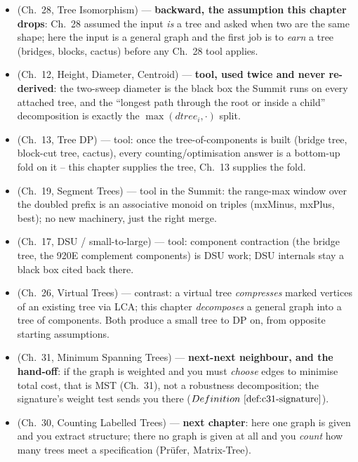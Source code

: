 
\begin{itemize}[nosep, leftmargin=1.4em]
  \item {} (Ch.~28, Tree Isomorphism) --- \textbf{backward, the assumption this
        chapter drops}: Ch.~28 assumed the input \emph{is} a tree and asked when two are
        the same shape; here the input is a general graph and the first job is to
        \emph{earn} a tree (bridges, blocks, cactus) before any Ch.~28 tool applies.
  \item {} (Ch.~12, Height, Diameter, Centroid) --- \textbf{tool, used twice and
        never re-derived}: the two-sweep diameter is the black box the Summit runs on
        every attached tree, and the ``longest path through the root or inside a child''
        decomposition is exactly the \(\max(\mathit{dtree}_i,\cdot)\) split.
  \item {} (Ch.~13, Tree DP) --- tool: once the tree-of-components is built
        (bridge tree, block-cut tree, cactus), every counting/optimisation answer is a
        bottom-up fold on it -- this chapter supplies the tree, Ch.~13 supplies the fold.
  \item {} (Ch.~19, Segment Trees) --- tool in the Summit: the range-max window
        over the doubled prefix is an associative monoid on triples (mxMinus, mxPlus,
        best); no new machinery, just the right merge.
  \item {} (Ch.~17, DSU / small-to-large) --- tool: component contraction (the
        bridge tree, the 920E complement components) is DSU work; DSU internals stay a
        black box cited back there.
  \item {} (Ch.~26, Virtual Trees) --- contrast: a virtual tree \emph{compresses}
        marked vertices of an existing tree via LCA; this chapter \emph{decomposes} a
        general graph into a tree of components.  Both produce a small tree to DP on,
        from opposite starting assumptions.
  \item {} (Ch.~31, Minimum Spanning Trees) --- \textbf{next-next neighbour, and
        the hand-off}: if the graph is weighted and you must \emph{choose} edges to
        minimise total cost, that is MST (Ch.~31), not a robustness decomposition; the
        signature's weight test sends you there (\(\defref{c31-signature}\)).
  \item {} (Ch.~30, Counting Labelled Trees) --- \textbf{next chapter}: here one
        graph is given and you extract structure; there no graph is given at all and you
        \emph{count} how many trees meet a specification (Pr\"ufer, Matrix-Tree).
\end{itemize}

